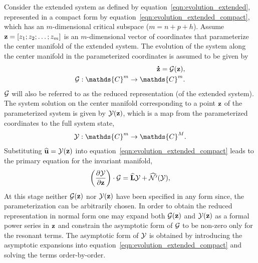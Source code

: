 Consider the extended system as defined by equation~\eqref{eqn:evolution_extended}, represented in a compact form by equation~\eqref{eqn:evolution_extended_compact}, which has an $m$-dimensional critical subspace ($m = n+p+h$). Assume $\mathbf{z} = [z_{1}; z_{2};\ldots;z_{m}]$ is an $m$-dimensional vector of coordinates that parameterize the center manifold of the extended system. The evolution of the system along the center manifold in the parameterized coordinates is assumed to be given by 
\begin{align}
	\dt{\vecparv} = \Param(\vecparv), \\
	\Param: \mathds{C}^{m} \rightarrow \mathds{C}^{m} \nonumber.
\end{align}
$\mathcal{G}$ will also be referred to as the reduced representation (of the extended system). The system solution on the center manifold corresponding to a point $\mathbf{z}$ of the parameterized system is given by $\mathcal{Y}(\mathbf{z})$, which is a map from the parameterized coordinates to the full system state,
\begin{align}
	\CenM:\mathds{C}^{m} \rightarrow \mathds{C}^{M}.
\end{align}
Substituting $\widehat{\mathbf{u}} = \mathcal{Y}(\mathbf{z})$ into equation~\eqref{eqn:evolution_extended_compact} leads to the primary equation for the invariant manifold,
\begin{align}
	\label{eqn:invariant_manifold}
	\left(\dfrac{\partial \mathcal{Y}}{\partial \mathbf{z}}\right)\cdot\mathcal{G} = \mathbf{\widehat{L}}\mathcal{Y} + \widehat{\mathcal{N}'}(\mathcal{Y}),
\end{align}
 At this stage neither $\mathcal{G}(\mathbf{z})$ nor $\mathcal{Y}(\mathbf{z})$ have been specified in any form since, the parameterization can be arbitrarily chosen. In order to obtain the reduced representation in normal form one may expand both $\mathcal{G}(\mathbf{z})$ and $\mathcal{Y}(\mathbf{z})$ as a formal power series in $\mathbf{z}$ and constrain the asymptotic form of $\mathcal{G}$ to be non-zero only for the resonant terms. The asymptotic form of $\mathcal{Y}$ is obtained by introducing the asymptotic expansions into equation~\eqref{eqn:evolution_extended_compact} and solving the terms order-by-order. 

